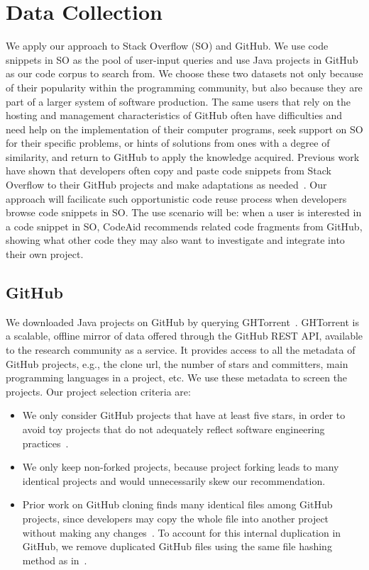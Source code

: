 \section{Data Collection}
\label{sec:dataset}
We apply our approach to Stack Overflow (SO) and GitHub. We use code snippets in SO as the pool of user-input queries and use Java projects in GitHub as our code corpus to search from. We choose these two datasets not only because of their popularity within the programming community, but also because they are part of a larger system of software production. The same users that rely on the hosting and management characteristics of GitHub often have difficulties and need help on the implementation of their computer programs, seek support on SO for their specific problems, or hints of solutions from ones with a degree of similarity, and return to GitHub to apply the knowledge acquired. Previous work have shown that developers often copy and paste code snippets from Stack Overflow to their GitHub projects and make adaptations as needed~\cite{yang2017stack, an2017stack, wu2018developers, zhang2019analyzing}. Our approach will facilicate such opportunistic code reuse process when developers browse code snippets in SO. The use scenario will be: when a user is interested in a code snippet in SO, CodeAid recommends related code fragments from GitHub, showing what other code they may also want to investigate and integrate into their own project. 


\subsection{GitHub}
We downloaded Java projects on GitHub by querying GHTorrent~\cite{gousios2012ghtorrent}. GHTorrent is a scalable, offline mirror of data offered through the GitHub REST API, available to the research community as a service. It provides access to all the metadata of GitHub projects, e.g., the clone url, the number of stars and committers, main programming languages in a project, etc. We use these metadata to screen the projects. Our project selection criteria are:
\begin{itemize}
	\item We only consider GitHub projects that have at least five stars, in order to avoid toy projects that do not adequately reflect software engineering practices~\cite{kalliamvakou2014promises}.
	\item We only keep non-forked projects, because project forking leads to many identical projects and would unnecessarily skew our recommendation.
	\item Prior work on GitHub cloning finds many identical files among GitHub projects, since developers may copy the whole file into another project without making any changes~\cite{lopes2017dejavu}. To account for this internal duplication in GitHub, we remove duplicated GitHub files using the same file hashing method as in~\cite{lopes2017dejavu}.
\end{itemize} 

